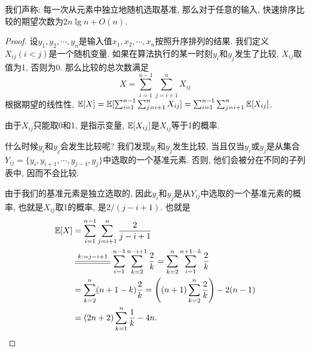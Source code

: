 我们声称: 每一次从元素中独立地随机选取基准, 那么对于任意的输入, 快速排序比较的期望次数为$2n\lg n + O(n)$. 

\begin{proof}
    设$y_1, y_2, \cdots, y_n$是输入值$x_1, x_2, \cdots, x_n$按照升序排列的结果. 我们定义$X_{ij}(i<j)$是一个随机变量. 如果在算法执行的某一时刻$y_i$和$y_j$发生了比较, $X_{ij}$取值为1, 否则为0. 那么比较的总次数满足
    $$
    X=\sum_{i=1}^{n-1}\sum_{j=i+1}^n X_{ij}
    $$
    根据期望的线性性, $\mathbb E[X]=\mathbb E[\sum_{i=1}^{n-1}\sum_{j=i+1}^n X_{ij}]=\sum_{i=1}^{n-1}\sum_{j=i+1}^n \mathbb E[X_{ij}]$. 

    由于$X_{ij}$只能取0和1, 是指示变量, $\mathbb E[X_{ij}]$是$X_{ij}$等于1的概率. 

    什么时候$y_i$和$y_j$会发生比较呢? 我们发现$y_i$和$y_j$发生比较, 当且仅当$y_i$或$y_j$是从集合$Y_{ij}=\{y_i, y_{i+1}, \cdots, y_{j-1},y_j\}$中选取的一个基准元素. 否则, 他们会被分在不同的子列表中, 因而不会比较. 

    由于我们的基准元素是独立选取的, 因此$y_i$和$y_j$是从$Y_{ij}$中选取的一个基准元素的概率, 也就是$X_{ij}$取1的概率, 是$2/(j-i+1)$. 也就是
    $$
    \begin{aligned}
        \Ep{X}&=\sum_{i=1}^{n-1} \sum_{j=i+1}^{n} \frac 2{j-i+1}\\
        &\varsub{k:=j-i+1}{1.5cm} \sum_{i=1}^{n-1}\sum_{k=2}^{n-i+1} \frac 2k = \sum_{k=2}^n \sum_{i=1}^{n+1-k} \frac 2k \\ 
        &= \sum_{k=2}^n (n+1-k) \frac 2k = \left((n+1)\sum_{k=2}^n \frac 2k\right)-2(n-1) \\
        &= (2n+2) \sum_{k=1}^n \frac 1k - 4n.
    \end{aligned} 
    $$
\end{proof}